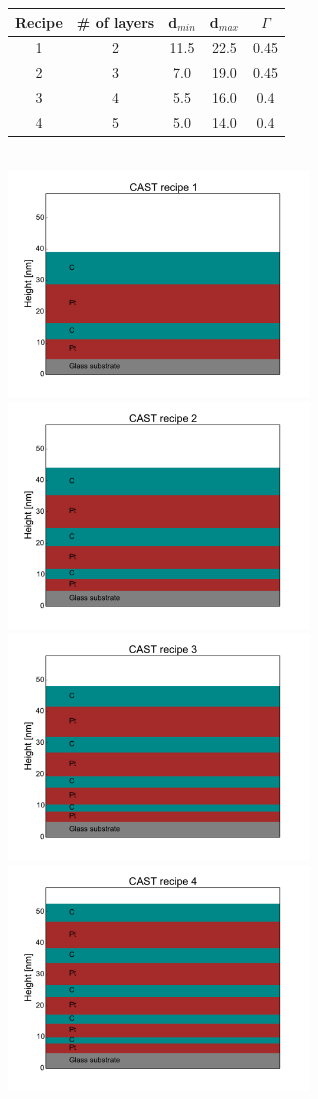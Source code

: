 \begin{figure}[htbp!]
  \centering
\begin{tabular}{c|c|c|c|c}
  Recipe & \# of layers & d$_{min}$ & d$_{max}$ & $\Gamma$  \\
  \hline
  1 & 2 & 11.5 & 22.5 & 0.45\\
  2 & 3 & 7.0 & 19.0 & 0.45\\
  3 & 4 & 5.5 & 16.0 & 0.4\\
  4 & 5 & 5.0 & 14.0 & 0.4
\end{tabular}  \\
\vspace{1 cm} \includegraphics[height=6cm]{figures/cast/cast-recipe1-sideview.pdf}
    \includegraphics[height=6cm]{figures/cast/cast-recipe2-sideview.pdf}
    \includegraphics[height=6cm]{figures/cast/cast-recipe3-sideview.pdf}
    \includegraphics[height=6cm]{figures/cast/cast-recipe4-sideview.pdf}


\end{figure}

